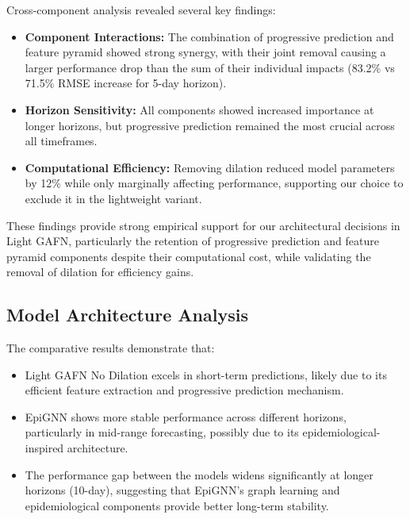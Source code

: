\documentclass[lettersize, journal]{IEEEtran}
\begin{document}
Cross-component analysis revealed several key findings:

\begin{itemize}
    \item \textbf{Component Interactions:} The combination of progressive prediction and feature pyramid showed strong synergy, with their joint removal causing a larger performance drop than the sum of their individual impacts (83.2\% vs 71.5\% RMSE increase for 5-day horizon).
    
    \item \textbf{Horizon Sensitivity:} All components showed increased importance at longer horizons, but progressive prediction remained the most crucial across all timeframes.
    
    \item \textbf{Computational Efficiency:} Removing dilation reduced model parameters by 12\% while only marginally affecting performance, supporting our choice to exclude it in the lightweight variant.
\end{itemize}

These findings provide strong empirical support for our architectural decisions in Light GAFN, particularly the retention of progressive prediction and feature pyramid components despite their computational cost, while validating the removal of dilation for efficiency gains.

\subsection{Model Architecture Analysis}
The comparative results demonstrate that:

\begin{itemize}
    \item Light GAFN No Dilation excels in short-term predictions, likely due to its efficient feature extraction and progressive prediction mechanism.
    
    \item EpiGNN shows more stable performance across different horizons, particularly in mid-range forecasting, possibly due to its epidemiological-inspired architecture.
    
    \item The performance gap between the models widens significantly at longer horizons (10-day), suggesting that EpiGNN's graph learning and epidemiological components provide better long-term stability.
\end{itemize}
\end{document}
